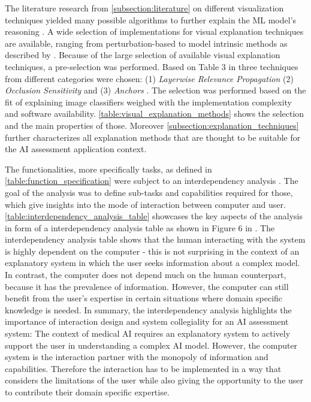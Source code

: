 \documentclass[11pt,a4paper,english]{scrreprt}
\begin{document}
The literature research from \autoref{subsection:literature} on different visualization techniques yielded many possible algorithms to further explain the ML model's reasoning \parencite{adadi_blackbox_2018,samek_explaining_2021,ribeiro_anchors_2018,arrieta_explainable_2019,ras_explainable_2021}. A wide selection of implementations for visual explanation techniques are available, ranging from perturbation-based to model intrinsic methods as described by \textcite{ras_explainable_2021}. Because of the large selection of available visual explanation techniques, a pre-selection was performed. Based on Table 3 in \textcite[p.7]{ras_explainable_2021} three techniques from different categories were chosen: (1) \textit{Layerwise Relevance Propagation} \parencite{bach_pixel_2015} (2) \textit{Occlusion Sensitivity} \parencite{zeiler_visualizing_2013} and (3) \textit{Anchors} \parencite{ribeiro_anchors_2018}. The selection was performed based on the fit of explaining image classifiers weighed with the implementation complexity and software availability. \autoref{table:visual_explanation_methods} shows the selection and the main properties of those. Moreover \autoref{subsection:explanation_techniques} further characterizes all explanation methods that are thought to be suitable for the AI assessment application context.

The functionalities, more specifically tasks, as defined in \autoref{table:function_specification} were subject to an interdependency analysis \parencite{johnson_coactive_2014}. The goal of the analysis was to define sub-tasks and capabilities required for those, which give insights into the mode of interaction between computer and user. \autoref{table:interdependency_analysis_table} showcases the key aspects of the analysis in form of a interdependency analysis table as shown in Figure 6 in \textcite[p.55]{johnson_coactive_2014}. The interdependency analysis table shows that the human interacting with the system is highly dependent on the computer - this is not surprising in the context of an explanatory system in which the user seeks information about a complex model. In contrast, the computer does not depend much on the human counterpart, because it has the prevalence of information. However, the computer can still benefit from the user's expertise in certain situations where domain specific knowledge is needed. In summary, the interdependency analysis highlights the importance of interaction design and system collegiality for an AI assessment system: The context of medical AI requires an explanatory system to actively support the user in understanding a complex AI model. However, the computer system is the interaction partner with the monopoly of information and capabilities. Therefore the interaction has to be implemented in a way that considers the limitations of the user while also giving the opportunity to the user to contribute their domain specific expertise.
\end{document}
